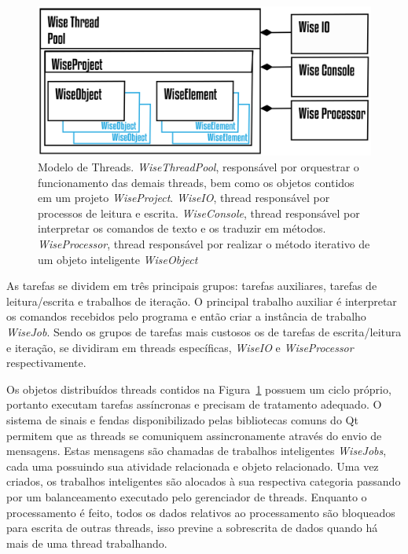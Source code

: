 \documentclass[a4paper,12pt]{monografia}
\theoremstyle{plain}
\theoremstyle{definition}
\theoremstyle{remark}
\begin{document}
\begin{figure}[!htbp]
	\centering
	\includegraphics[width=\linewidth]{Figures/WiseThreadPool@16x.png}
	\caption{Modelo de Threads. \textit{WiseThreadPool}, responsável por orquestrar o funcionamento das demais threads, bem como os objetos contidos em um projeto \textit{WiseProject}. \textit{WiseIO}, thread responsável por processos de leitura e escrita. \textit{WiseConsole}, thread responsável por interpretar os comandos de texto e os traduzir em métodos. \textit{WiseProcessor}, thread responsável por realizar o método iterativo de um objeto inteligente \textit{WiseObject}}
	\label{fig7:threads}
\end{figure}

As tarefas se dividem em três principais grupos: tarefas auxiliares, tarefas de leitura/escrita e trabalhos de iteração. O principal trabalho auxiliar é interpretar os comandos recebidos pelo programa e então criar a instância de trabalho \textit{WiseJob}. Sendo os grupos de tarefas mais custosos os de tarefas de escrita/leitura e iteração, se dividiram em threads específicas, \textit{WiseIO} e \textit{WiseProcessor} respectivamente.

Os objetos distribuídos threads contidos na Figura~\ref{fig7:threads} possuem um ciclo próprio, portanto executam tarefas assíncronas e precisam de tratamento adequado. O sistema de sinais e fendas disponibilizado pelas bibliotecas comuns do Qt permitem que as threads se comuniquem assincronamente através do envio de mensagens. Estas mensagens são chamadas de trabalhos inteligentes \textit{WiseJobs}, cada uma possuindo sua atividade relacionada e objeto relacionado. Uma vez criados, os trabalhos inteligentes são alocados à sua respectiva categoria passando por um balanceamento executado pelo gerenciador de threads. Enquanto o processamento é feito, todos os dados relativos ao processamento são bloqueados para escrita de outras threads, isso previne a sobrescrita de dados quando há mais de uma thread trabalhando.
\end{document}
